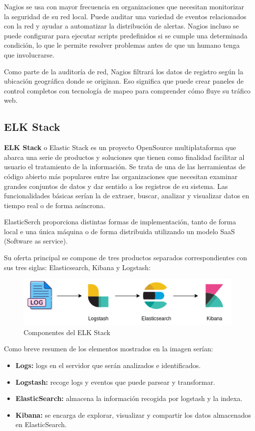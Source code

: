 Nagios se usa con mayor frecuencia en organizaciones que necesitan monitorizar la seguridad de su red local. Puede auditar una variedad de eventos relacionados con la red y ayudar a automatizar la distribución de alertas. Nagios incluso se puede configurar para ejecutar scripts predefinidos si se cumple una determinada condición, lo que le permite resolver problemas antes de que un humano tenga que involucrarse.

Como parte de la auditoría de red, Nagios filtrará los datos de registro según la ubicación geográfica donde se originan. Eso significa que puede crear paneles de control completos con tecnología de mapeo para comprender cómo fluye su tráfico web.

\subsection{ELK Stack}
\label{sec:elk_stack}
\textbf{ELK Stack} o Elastic Stack es un proyecto OpenSource multiplataforma que abarca una serie de productos y soluciones que tienen como finalidad facilitar al usuario el tratamiento de la información. Se trata de una de las herramientas de código abierto más populares entre las organizaciones que necesitan examinar grandes conjuntos de datos y dar sentido a los registros de su sistema. Las funcionalidades básicas serían la de extraer, buscar, analizar y visualizar datos en tiempo real o de forma asíncrona.

ElasticSerch proporciona distintas formas de implementación, tanto de forma local e una única máquina o de forma distribuida utilizando un modelo SaaS (Software as service).

Su oferta principal se compone de tres productos separados correspondientes con sus tres siglas: Elasticsearch, Kibana y Logstash:

\begin{figure}[H]
\centerline{\includegraphics[width=15cm]{figuras/elkstack.png}}
\caption{Componentes del ELK Stack}
\label{enlace1}
\end{figure}

Como breve resumen de los elementos mostrados en la imagen serían:
\begin{itemize}
\item \textbf{Logs:} logs en el servidor que serán analizados e identificados.
\item \textbf{Logstash:} recoge logs y eventos que puede parsear y transformar.
\item \textbf{ElasticSearch:} almacena la información recogida por logstash y la indexa.
\item \textbf{Kibana:} se encarga de explorar, visualizar y compartir los datos almacenados en ElasticSearch.
\end{itemize}

